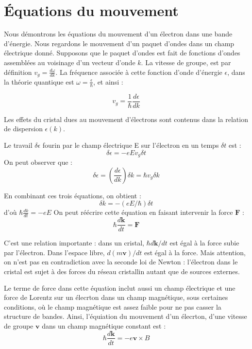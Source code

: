 \chapter{Équations du mouvement}

Nous démontrons les équations du mouvement d'un électron dans une bande
d'énergie. Nous regardons le mouvement d'un paquet d'ondes dans un champ
électrique donné. Supposons que le paquet d'ondes est fait de fonctions d'ondes
assemblées au voisinage d'un vecteur d'onde $k$. La vitesse de groupe, est par
définition $v_g = \frac{d\omega}{dk}$. La fréquence associée à cette fonction
d'onde d'énergie $\epsilon$, dans la théorie quantique est $\omega =
\frac{\epsilon}{\hbar}$, et ainsi :

\begin{equation}
    v_g = \frac{1}{\hbar} \frac{d\epsilon}{dk}
\end{equation}

Les effets du cristal dues au mouvement d'électrons sont contenus dans la
relation de dispersion $\epsilon(k)$.

Le travail $\delta \epsilon$ fourin par le champ électrique E sur l'électron en
un temps $\delta t$ est :
\begin{equation}
    \delta \epsilon = - e E v_g \delta t
\end{equation}
On peut observer que :
\begin{equation}
    \delta \epsilon = (\frac{d\epsilon}{dk})\delta k = \hbar v_g \delta k
\end{equation}

En combinant ces trois  équations, on obtient :
\begin{equation}
    \delta k = -(eE/\hbar)\delta t
\end{equation}
d'où $\hbar \frac{dk}{dt} = -eE$
On peut réécrire cette équation en faisant intervenir la force $\mathbf{F}$ : 
\begin{equation}
    \hbar \frac{d\mathbf{k}}{dt} = \mathbf{F}
\end{equation}

C'est une relation importante : dans un cristal, $\hbar d\mathbf{k}/dt$ est égal
à la force subie par l'électron. Dans l'espace libre, $d(m\mathbf{v})/dt$ est
égal à la force. Mais attention, on n'est pas en contradiction avec la seconde
loi de Newton : l'électron dans le cristal est sujet à des forces du réseau
cristallin autant que de sources externes.

Le terme de force dans cette équation inclut aussi un champ électrique et une
force de Lorentz sur un élecrton dans un champ magnétique, sous certaines
conditions, où le champ magnétique est assez faible pour ne pas casser la
structure de bandes. Ainsi, l'équiation du mouvement d'un élecrton, d'une vitesse
de groupe $\mathbf{v}$ dans un champ magnétique constant est :
\begin{equation}
    \hbar \frac{d\mathbf{k}}{dt} = -e\mathbf{v}\times{B}
\end{equation}

